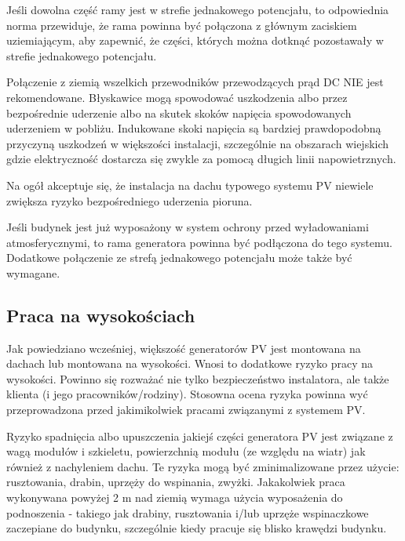 \documentclass[12pt,a4paper]{article}
\begin{document}
 

Jeśli dowolna część ramy jest w strefie jednakowego potencjału, to 
odpowiednia norma przewiduje, że rama powinna być połączona z głównym 
zaciskiem uziemiającym, aby zapewnić, że części, których można dotknąć 
pozostawały w strefie jednakowego potencjału. 

 

Połączenie z ziemią wszelkich przewodników przewodzących prąd DC NIE 
jest rekomendowane. Błyskawice mogą spowodować uszkodzenia albo przez 
bezpośrednie uderzenie albo na skutek skoków napięcia spowodowanych 
uderzeniem w pobliżu. Indukowane skoki napięcia są bardziej prawdopodobną przyczyną uszkodzeń w większości instalacji, szczególnie 
na obszarach wiejskich gdzie elektryczność dostarcza się zwykle za 
pomocą długich linii napowietrznych. 

 

Na ogół akceptuje się, że instalacja na dachu typowego systemu PV 
niewiele zwiększa ryzyko bezpośredniego uderzenia pioruna. 

 

Jeśli budynek jest już wyposażony w system ochrony przed wyładowaniami 
atmosferycznymi, to rama generatora powinna być podłączona do tego 
systemu. Dodatkowe połączenie ze strefą jednakowego potencjału może 
także być wymagane. 

 

\subsection{Praca na wysokościach }


Jak powiedziano wcześniej, większość generatorów PV jest montowana na 
dachach lub montowana na wysokości. Wnosi to dodatkowe ryzyko pracy na 
wysokości. Powinno się rozważać nie tylko bezpieczeństwo instalatora, 
ale także klienta (i jego pracowników/rodziny). Stosowna ocena ryzyka 
powinna wyć przeprowadzona przed jakimikolwiek pracami związanymi z 
systemem PV. 

 

Ryzyko spadnięcia albo upuszczenia jakiejś części generatora PV jest 
związane z wagą modułów i szkieletu, powierzchnią modułu (ze względu na 
wiatr) jak również z nachyleniem dachu. Te ryzyka mogą być 
zminimalizowane przez użycie: rusztowania, drabin, uprzęży do wspinania, 
zwyżki. Jakakolwiek praca wykonywana powyżej 2 m nad ziemią wymaga 
użycia wyposażenia do podnoszenia - takiego jak drabiny, rusztowania 
i/lub uprzęże wspinaczkowe zaczepiane do budynku, szczególnie kiedy 
pracuje się blisko krawędzi budynku. 
\end{document}
